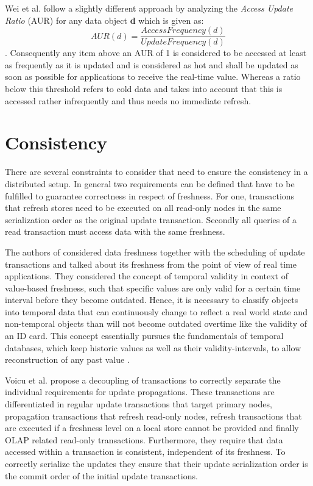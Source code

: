 Wei et al. \cite{wei:2004} follow a slightly different approach by analyzing the \emph{Access Update Ratio} (AUR) for any data object \textbf{d} which is given as: 
\begin{equation}
AUR(d) = \frac{AccessFrequency(d)}{UpdateFrequency(d)}
\end{equation}. 
Consequently any item above an AUR of 1 is considered to be accessed at least as frequently as it is updated
and is considered as hot and shall be updated as soon as possible for applications to receive the real-time value. 
Whereas a ratio below this threshold refers to cold data and takes into account that this is accessed rather infrequently and thus needs no immediate refresh. 






\section{Consistency}
There are several constraints to consider that need to ensure the consistency in a distributed setup. In general two requirements can be defined that have to be fulfilled to
guarantee correctness in respect of freshness. For one, transactions that refresh stores need to be executed on all read-only nodes in the same serialization order as the 
original update transaction. Secondly all queries of a read transaction must access data with the same freshness.


The authors of \cite{xiang:2008}\cite{wei:2004} considered data freshness together with the scheduling of update transactions and talked about its freshness from the 
point of view of real time applications. They considered the concept of temporal validity in context of value-based freshness,
such that specific values are only valid for a certain time interval before they become outdated. Hence, it is necessary to classify objects into
temporal data that can continuously change to reflect a real world state and non-temporal objects than will not become outdated overtime like the validity of an ID card.
This concept essentially pursues the fundamentals of temporal databases, which keep historic values as well as their validity-intervals, to allow reconstruction of any 
past value \cite{etzion:1998}. 

Voicu et al. \cite{voicu:2010} propose a decoupling of transactions to correctly separate the individual requirements for update propagations.
These transactions are differentiated in regular update transactions that target primary nodes, propagation transactions that refresh read-only nodes, 
refresh transactions that are executed if a freshness level on a local store cannot be provided and finally OLAP related read-only transactions.
Furthermore, they require that data accessed within a transaction is consistent, independent of its freshness. To correctly serialize the updates
they ensure that their update serialization order is the commit order of the initial update transactions.

